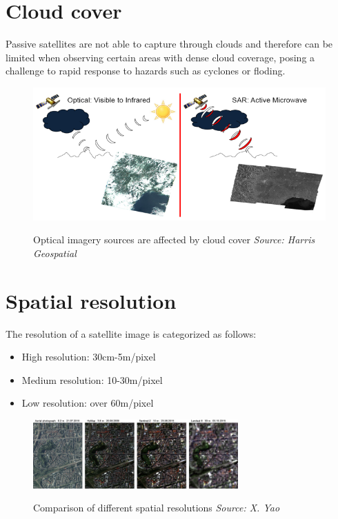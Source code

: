 \documentclass[
  a4paper,
  onecolumn,
  oneside]{book}
\providecommand{\tightlist}{%
  \setlength{\itemsep}{0pt}\setlength{\parskip}{0pt}}\usepackage{longtable,booktabs,array}
\begin{document}
\hypertarget{cloud-cover}{%
\section{Cloud cover}\label{cloud-cover}}

Passive satellites are not able to capture through clouds and therefore
can be limited when observing certain areas with dense cloud coverage,
posing a challenge to rapid response to hazards such as cyclones or
floding.

\begin{figure}

{\centering 

\href{/part2/images/cloud.png}{\includegraphics{part2/images/cloud.png}}

}

\caption{Optical imagery sources are affected by cloud cover
\emph{Source: Harris Geospatial}}

\end{figure}

\hypertarget{spatial-resolution}{%
\section{Spatial resolution}\label{spatial-resolution}}

The resolution of a satellite image is categorized as follows:

\begin{itemize}
\tightlist
\item
  High resolution: 30cm-5m/pixel
\item
  Medium resolution: 10-30m/pixel
\item
  Low resolution: over 60m/pixel
\end{itemize}

\begin{figure}

\href{/part2/images/spatial-resolution.jpg}{\includegraphics[width=0.7\textwidth,height=\textheight]{part2/images/spatial-resolution.jpg}}

Comparison of different spatial resolutions \emph{Source: X. Yao}

\end{figure}
\end{document}
